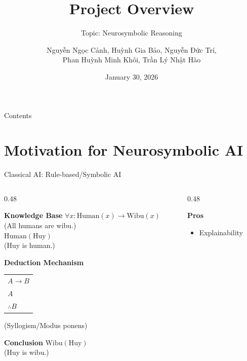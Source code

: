 \documentclass[10pt, aspectratio=169]{beamer}
\title[Data Preparation - NLP Project]{Project Overview}
\subtitle{Topic: Neurosymbolic Reasoning}
\author{Nguyễn Ngọc Cảnh, Huỳnh Gia Bảo, Nguyễn Đức Trí,\\Phan Huỳnh Minh Khôi, Trần Lý Nhật Hào}
\institute{Faculty of Information Technology\\University of Science - VNUHCM}
\date{January 30, 2026}
\begin{document}
\begin{frame}
  \titlepage
\end{frame}

\begin{frame}{Contents}
  \tableofcontents
\end{frame}

\section{Motivation for Neurosymbolic AI}

\begin{frame}{Classical AI: Rule-based/Symbolic AI}
  \begin{columns}[T] %
    \begin{column}{0.48\textwidth}
      \centering
      \begin{block}{\textbf{Knowledge Base}}
        $\forall x: \text{Human}(x) \rightarrow \text{Wibu}(x)$ \\
        \hfill {\footnotesize (All humans are wibu.)} \\
        $\text{Human}(\text{Huy})$ \\
        \hfill {\footnotesize (Huy is human.)}
      \end{block}
      \pause
      \begin{block}{\textbf{Deduction Mechanism}}
        \begin{tabular}{l}
          $A \rightarrow B$ \\
          $A$ \\
          \midrule
          \hfill $\therefore B$
        \end{tabular}
        \hfill {\footnotesize (Syllogism/Modus ponens)}
      \end{block}
      \pause
      \begin{block}{\textbf{Conclusion}}
        $\text{Wibu}(\text{Huy})$ \\
        \hfill {\footnotesize (Huy is wibu.)}
      \end{block}
    \end{column}
    \begin{column}{0.48\textwidth}
      \pause
      \begin{exampleblock}{\textbf{Pros}}
        \begin{itemize}
          \item Explainability

\end{itemize}
\end{exampleblock}
\end{column}
\end{columns}
\end{frame}
\end{document}

